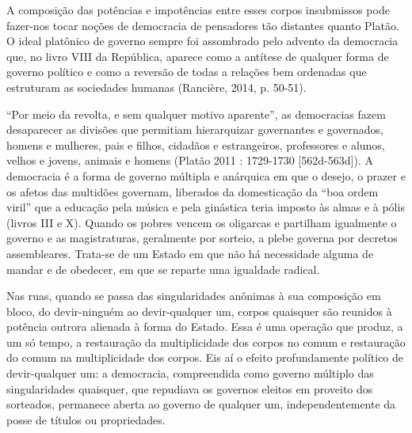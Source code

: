 A composição das potências e impotências entre esses corpos insubmissos
pode fazer-nos tocar noções de democracia de pensadores tão distantes
quanto Platão. O ideal platônico de governo sempre foi assombrado pelo
advento da democracia que, no livro VIII da República, aparece como a
antítese de qualquer forma de governo político e como a reversão de
todas a relações bem ordenadas que estruturam as sociedades humanas
(Rancière, 2014, p. 50-51).

``Por meio da revolta, e sem qualquer motivo aparente'', as democracias
fazem desaparecer as divisões que permitiam hierarquizar governantes e
governados, homens e mulheres, pais e filhos, cidadãos e estrangeiros,
professores e alunos, velhos e jovens, animais e homens (Platão 2011 :
1729-1730 {[}562d-563d{]}). A democracia é a forma de governo múltipla e
anárquica em que o desejo, o prazer e os afetos das multidões governam,
liberados da domesticação da ``boa ordem viril'' que a educação pela
música e pela ginástica teria imposto às almas e à pólis (livros III e
X). Quando os pobres vencem os oligarcas e partilham igualmente o
governo e as magistraturas, geralmente por sorteio, a plebe governa por
decretos assembleares. Trata-se de um Estado em que não há necessidade
alguma de mandar e de obedecer, em que se reparte uma igualdade radical.

Nas ruas, quando se passa das singularidades anônimas à sua composição
em bloco, do devir-ninguém ao devir-qualquer um, corpos quaisquer são
reunidos à potência outrora alienada à forma do Estado. Essa é uma
operação que produz, a um só tempo, a restauração da multiplicidade dos
corpos no comum e restauração do comum na multiplicidade dos corpos. Eis
aí o efeito profundamente político de devir-qualquer um: a democracia,
compreendida como governo múltiplo das singularidades quaisquer, que
repudiava os governos eleitos em proveito dos sorteados, permanece
aberta ao governo de qualquer um, independentemente da posse de títulos
ou propriedades.

